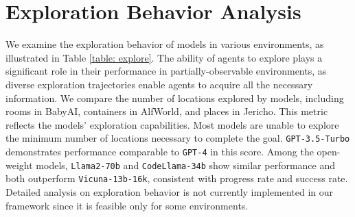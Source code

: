 \section{Exploration Behavior Analysis}
\label{appendix: exploration}
We examine the exploration behavior of models in various environments, as illustrated in Table \ref{table: explore}. The ability of agents to explore plays a significant role in their performance in partially-observable environments, as diverse exploration trajectories enable agents to acquire all the necessary information.
We compare the number of locations explored by models, including rooms in BabyAI, containers in AlfWorld, and places in Jericho. This metric reflects the models' exploration capabilities. Most models are unable to explore the minimum number of locations necessary to complete the goal. \texttt{GPT-3.5-Turbo} demonstrates performance comparable to \texttt{GPT-4} in this score. Among the open-weight models, \texttt{Llama2-70b} and \texttt{CodeLlama-34b} show similar performance and both outperform \texttt{Vicuna-13b-16k}, consistent with progress rate and success rate. 
Detailed analysis on exploration behavior is not currently implemented in our \BenchName{} framework since it is feasible only for some environments.
